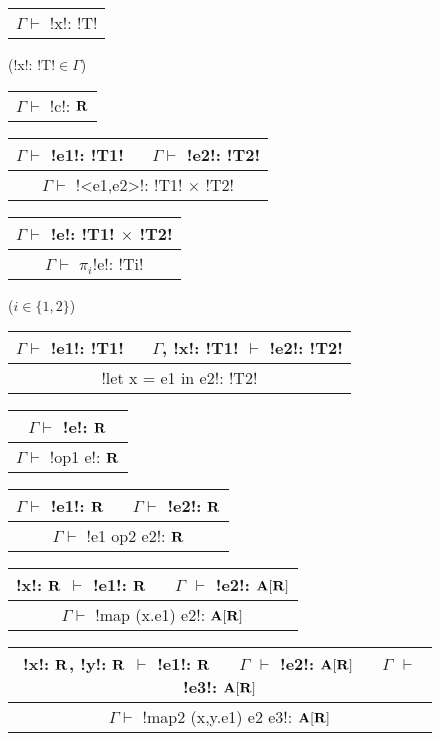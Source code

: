 \begin{figure*}[tb]
    \centering
    \begin{tabular}{c} 
    \\\hline
    $\Gamma \vdash$ !x!: !T!
    \end{tabular}(!x!: !T!$\in\Gamma$)
    \hspace{0.5cm}
    \begin{tabular}{c} 
        \\\hline
        $\Gamma \vdash$ !c!: $\mathbf{R}$
    \end{tabular}
    \hspace{0.5cm}
    \begin{tabular}{c}
    $\Gamma \vdash$ !e1!: !T1! $\quad$ $\Gamma \vdash$ !e2!: !T2! \\\hline  
    $\Gamma \vdash$ !<e1,e2>!: !T1! $\times$ !T2!
    \end{tabular}
    \hspace{0.5cm}
    \begin{tabular}{c}
        $\Gamma \vdash$ !e!: !T1! $\times$ !T2! \\\hline  
        $\Gamma \vdash$ $\pi_i$!e!: !Ti!
    \end{tabular}($i\in\{1,2\}$)

    \begin{tabular}{c}
    $\Gamma \vdash$ !e1!: !T1! $\quad$ $\Gamma$, !x!: !T1! $\vdash$ !e2!: !T2! \\\hline
    !let x = e1 in e2!: !T2!
    \end{tabular}
    \hspace{0.5cm}
    \begin{tabular}{c}
        $\Gamma \vdash$ !e!: $\mathbf{R}$ \\\hline  
        $\Gamma \vdash$ !op1 e!: $\mathbf{R}$
    \end{tabular}
    \hspace{0.5cm}
    \begin{tabular}{c}
        $\Gamma \vdash$ !e1!: $\mathbf{R}$ $\quad$ $\Gamma \vdash$ !e2!: $\mathbf{R}$ \\\hline  
        $\Gamma \vdash$ !e1 op2 e2!: $\mathbf{R}$
        \end{tabular}
 
    \begin{tabular}{c}
        !x!: $\mathbf{R}$ $\vdash$ !e1!: $\mathbf{R}$ $\quad$ $\Gamma$ $\vdash$ !e2!: $\mathbf{A}[\mathbf{R}]$
        \\\hline  
        $\Gamma \vdash$ !map (x.e1) e2!: $\mathbf{A}[\mathbf{R}]$
    \end{tabular}
    \hspace{0.5cm}
    \begin{tabular}{c}
        !x!: $\mathbf{R}$, !y!: $\mathbf{R}$ $\vdash$ !e1!: $\mathbf{R}$ 
        $\quad$ $\Gamma$ $\vdash$ !e2!: $\mathbf{A}[\mathbf{R}]$
        $\quad$ $\Gamma$ $\vdash$ !e3!: $\mathbf{A}[\mathbf{R}]$
        \\\hline  
        $\Gamma \vdash$ !map2 (x,y.e1) e2 e3!: $\mathbf{A}[\mathbf{R}]$
    \end{tabular}


\end{figure*}
